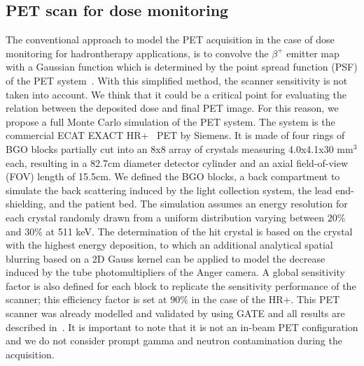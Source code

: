 \documentclass[11pt]{iopart}
\begin{document}


\subsection{PET scan for dose monitoring}

The conventional approach to model the PET acquisition in the case of
dose monitoring for hadrontherapy applications, is to convolve the
$\beta^{+}$ emitter map with a Gaussian function which is determined
by the point spread function (PSF) of the PET
system~\cite{Parodi2007a}. With this simplified method, the scanner
sensitivity is not taken into account. We think that it could be a
critical point for evaluating the relation between the deposited dose
and final PET image. For this reason, we propose a full Monte Carlo
simulation of the PET system. The system is the commercial ECAT EXACT
HR+~\cite{Brix1997} PET by Siemens. It is made of four rings of BGO
blocks partially cut into an 8x8 array of crystals measuring
4.0x4.1x30 mm$^3$ each, resulting in a 82.7cm diameter detector
cylinder and an axial field-of-view (FOV) length of 15.5cm. We defined
the BGO blocks, a back compartment to simulate the back scattering
induced by the light collection system, the lead end-shielding, and
the patient bed. The simulation assumes an energy resolution for each
crystal randomly drawn from a uniform distribution varying between $20
\%$ and $30 \%$ at 511 keV. The determination of the hit crystal is
based on the crystal with the highest energy deposition, to which an
additional analytical spatial blurring based on a 2D Gauss kernel can
be applied to model the decrease induced by the tube photomultipliers
of the Anger camera. A global sensitivity factor is also defined for
each block to replicate the sensitivity performance of the scanner;
this efficiency factor is set at $90 \%$ in the case of the HR+. This
PET scanner was already modelled and validated by using GATE and all
results are described in~\cite{Jan2005}. It is important to note that
it is not an in-beam PET configuration and we do not consider prompt
gamma and neutron contamination during the acquisition.

\end{document}
